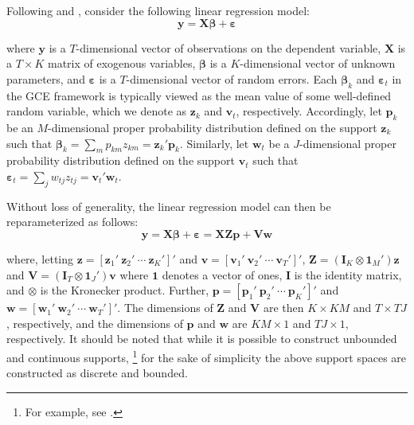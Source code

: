 \documentclass{elsarticle}
\begin{document}
Following \cite{golan1996} and \citet{golan2008}, consider the following 
linear regression model: 
\begin{equation}
\mathbf{y} = \mathbf{X\beta} + \mathbf{\varepsilon}
\end{equation}

\noindent
where $\mathbf{y}$ is a $T$-dimensional vector of observations on the 
dependent variable, $\mathbf{X}$ is a $T\times K$ matrix of exogenous
variables, $\mathbf{\beta}$ is a $K$-dimensional vector of unknown 
parameters, and $\mathbf{\varepsilon}$ is a $T$-dimensional vector of 
random errors.
Each $\mathbf{\beta}_k$ and $\mathbf{\varepsilon}_t$ in the GCE 
framework is typically viewed as the mean value of some well-defined 
random variable, which we denote as $\mathbf{z}_k$ and $\mathbf{v}_t$, 
respectively.
Accordingly, let $\mathbf{p}_k$ be an $M$-dimensional proper 
probability distribution defined on the support $\mathbf{z}_k$ such that 
$\mathbf{\beta}_k = \sum_m p_{km}z_{km} = \mathbf{z}_k' 
\mathbf{p}_k$.
Similarly, let $\mathbf{w}_t$ be a $J$-dimensional proper probability 
distribution defined on the support $\mathbf{v}_t$ such that  
$\mathbf{\varepsilon}_t = \sum_j w_{tj}z_{tj} = \mathbf{v}_t' 
\mathbf{w}_t$.

Without loss of generality, the linear regression model can then be 
reparameterized as follows:
\begin{equation}
\mathbf{y} = \mathbf{X\beta} + \mathbf{\varepsilon} = 
\mathbf{X Z p} + \mathbf{V w}
\label{eq: reparm}
\end{equation}

\noindent
where, letting $\mathbf{z}=[\mathbf{z}_1' ~ \mathbf{z}_2' ~ \cdots ~ 
\mathbf{z}_K' ]'$ and $\mathbf{v}=[\mathbf{v}_1' ~ \mathbf{v}_2' ~ 
\cdots ~ \mathbf{v}_T' ]'$, 
$\mathbf{Z}= (\mathbf{I}_K \otimes \mathbf{1}_M')\mathbf{z}$ and
$\mathbf{V}= (\mathbf{I}_T \otimes \mathbf{1}_J')\mathbf{v}$
where $\mathbf{1}$ denotes a vector of ones, $\mathbf{I}$ is the 
identity matrix, and $\otimes$ is the Kronecker product.
Further, $\mathbf{p} = [\mathbf{p}_1' ~ \mathbf{p}_2' ~ \cdots ~ 
\mathbf{p}_K' ]'$ and $\mathbf{w} = [\mathbf{w}_1' ~ \mathbf{w}_2' 
~ \cdots ~ \mathbf{w}_T' ]'$.
The dimensions of $\mathbf{Z}$ and $\mathbf{V}$ are then 
$K \times KM$ and $T \times TJ$, respectively, and the dimensions of 
$\mathbf{p}$ and $\mathbf{w}$ are $KM \times 1$ and $TJ \times 1$, 
respectively.
It should be noted that while it is possible to construct unbounded and 
continuous supports,%
\footnote{For example, see \citet{golan2002}.}
for the sake of simplicity the above support spaces are constructed as 
discrete and bounded. 
\end{document}

